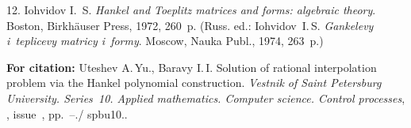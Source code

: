 {12. Iohvidov I.~S. \emph{Hankel and Toeplitz matrices and forms:
algebraic theory}. Boston, Birkh\"auser Press, 1972, 260~p. (Russ.
ed.: Iohvidov~I.\,S. \emph{Gankelevy i~teplicevy matricy i~formy}.
Moscow, Nauka Publ., 1974, 263~p.)



\vskip 2mm

{\bf For citation:} Uteshev A.\,Yu., Baravy I.\,I. Solution of
rational interpolation problem  via the Hankel polynomial
construction. {\it Vestnik of Saint Petersburg University.
Series~10. Applied mathematics. Computer science. Control
processes}, \issueyear, issue~\issuenum,
pp.~\pageref{p3}--\pageref{p3e}.\doivyp/
spbu10.\issueyear.



}
